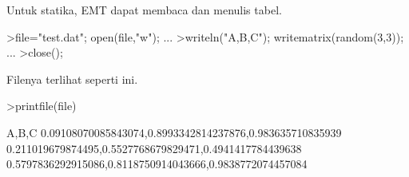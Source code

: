 \documentclass[a4paper,10pt]{article}
\begin{document}
\begin{eulernotebook}
\begin{eulercomment}
\begin{eulercomment}
\begin{eulercomment}
Untuk statika, EMT dapat membaca dan menulis tabel.
\end{eulercomment}
\begin{eulerprompt}
>file="test.dat"; open(file,"w"); ...
>writeln("A,B,C"); writematrix(random(3,3)); ...
>close();
\end{eulerprompt}
\begin{eulercomment}
Filenya terlihat seperti ini.
\end{eulercomment}
\begin{eulerprompt}
>printfile(file)
\end{eulerprompt}
\begin{euleroutput}
  A,B,C
  0.09108070085843074,0.8993342814237876,0.983635710835939
  0.211019679874495,0.5527768679829471,0.4941417784439638
  0.5797836292915086,0.8118750914043666,0.9838772074457084
  

\end{euleroutput}
\end{eulercomment}
\end{eulercomment}
\end{eulernotebook}
\end{document}
